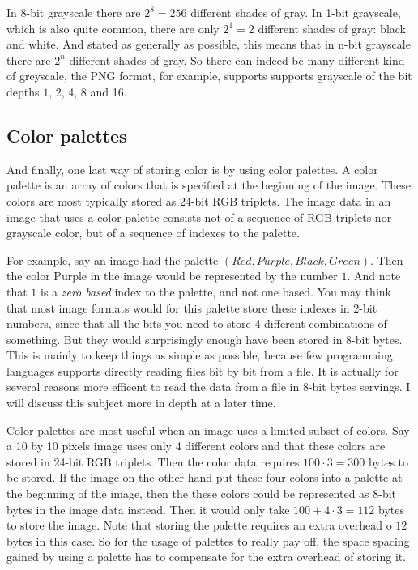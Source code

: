 In 8-bit grayscale there are $2^8 = 256$ different shades of gray. In
1-bit grayscale, which is also quite common, there are only $2^1 = 2$
different shades of gray: black and white. And stated as generally as
possible, this means that in n-bit grayscale there are $2^n$ different
shades of gray. So there can indeed be many different kind of
greyscale, the PNG format, for example, supports supports grayscale of
the bit depths $1$, 2, 4, 8 and
16\cite{boutel:_png_portab_networ_graph_specif_version12}.

\subsection{Color palettes}

And finally, one last way of storing color is by using color
palettes. A color palette is an array of colors that is specified at
the beginning of the image. These colors are most typically stored as
24-bit RGB triplets. The image data in an image that uses a color
palette consists not of a sequence of RGB triplets nor grayscale
color, but of a sequence of indexes to the palette.

For example, say an image had the palette $(Red, Purple, Black,
Green)$. Then the color Purple in the image would be represented by
the number $1$. And note that $1$ is a \textit{zero based} index to
the palette, and not one based. You may think that most image formats
would for this palette store these indexes in 2-bit numbers, since
that all the bits you need to store 4 different combinations of
something. But they would surprisingly enough have been stored in
8-bit bytes. This is mainly to keep things as simple as possible,
because few programming languages supports directly reading files bit
by bit from a file. It is actually for several reasons more efficent
to read the data from a file in 8-bit bytes servings. I will discuss
this subject more in depth at a later time.

Color palettes are most useful when an image uses a limited subset of
colors. Say a 10 by 10 pixels image uses only 4 different colors and
that these colors are stored in 24-bit RGB triplets. Then the color
data requires $100 \cdot 3 = 300$ bytes to be stored. If the image on
the other hand put these four colors into a palette at the beginning
of the image, then the these colors could be represented as 8-bit
bytes in the image data instead. Then it would only take $100 + 4
\cdot 3 = 112$ bytes to store the image. Note that storing the palette
requires an extra overhead o $12$ bytes in this case. So for the usage
of palettes to really pay off, the space spacing gained by using a
palette has to compensate for the extra overhead of storing it.

